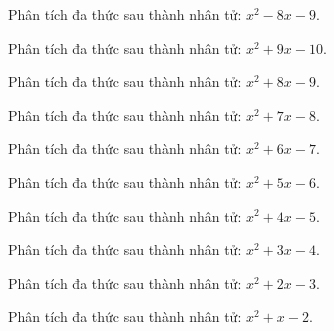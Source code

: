 \begin{bt}
	Phân tích đa thức sau thành nhân tử: $x^2 - 8 x - 9$.
\end{bt}
\begin{bt}
	Phân tích đa thức sau thành nhân tử: $x^2 + 9 x - 10$.
\end{bt}
\begin{bt}
	Phân tích đa thức sau thành nhân tử: $x^2 + 8 x - 9$.
\end{bt}
\begin{bt}
	Phân tích đa thức sau thành nhân tử: $x^2 + 7 x - 8$.
\end{bt}
\begin{bt}
	Phân tích đa thức sau thành nhân tử: $x^2 + 6 x - 7$.
\end{bt}
\begin{bt}
	Phân tích đa thức sau thành nhân tử: $x^2 + 5 x - 6$.
\end{bt}
\begin{bt}
	Phân tích đa thức sau thành nhân tử: $x^2 + 4 x - 5$.
\end{bt}
\begin{bt}
	Phân tích đa thức sau thành nhân tử: $x^2 + 3 x - 4$.
\end{bt}
\begin{bt}
	Phân tích đa thức sau thành nhân tử: $x^2 + 2 x - 3$.
\end{bt}
\begin{bt}
	Phân tích đa thức sau thành nhân tử: $x^2 + x - 2$.
\end{bt}

